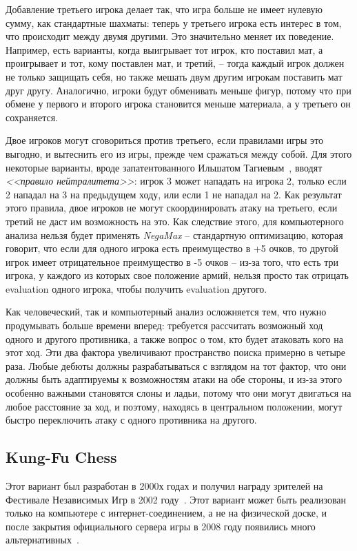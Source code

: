 \documentclass{article}
\begin{document}
Добавление третьего игрока делает так, что игра больше не имеет нулевую сумму,
как стандартные шахматы:
теперь у третьего игрока есть интерес в том, что происходит между двумя другими.
Это значительно меняет их поведение.
Например, есть варианты, когда выигрывает тот игрок, кто поставил мат,
а проигрывает и тот, кому поставлен мат, и третий, -- 
тогда каждый игрок должен не только защищать себя, но также мешать двум другим игрокам поставить мат друг другу.
Аналогично, игроки будут обменивать меньше фигур,
потому что при обмене у первого и второго игрока становится меньше материала,
а у третьего он сохраняется.

Двое игроков могут сговориться против третьего, если правилами игры это выгодно,
и вытеснить его из игры, прежде чем сражаться между собой.
Для этого некоторые варианты, вроде запатентованного Ильшатом Тагиевым~\cite{triad-chess},
вводят \emph{<<правило нейтралитета>>}:
игрок 3 может нападать на игрока 2, только если 2 нападал на 3 на предыдущем ходу,
или если 1 не нападал на 2. 
Как результат этого правила, двое игроков не могут скоординировать атаку на третьего,
если третий не даст им возможность на это. 
Как следствие этого, для компьютерного анализа нельзя будет применять \emph{NegaMax} --
стандартную оптимизацию, которая говорит, что если для одного игрока есть преимущество в +5 очков,
то другой игрок имеет отрицательное преимущество в -5 очков -- 
из-за того, что есть три игрока, у каждого из которых свое положение армий,
нельзя просто так отрицать evaluation одного игрока, 
чтобы получить evaluation другого.

Как человеческий, так и компьютерный анализ осложняется тем, что нужно продумывать больше времени вперед:
требуется рассчитать возможный ход одного и другого противника, а также
вопрос о том, кто будет атаковать кого на этот ход. 
Эти два фактора увеличивают пространство поиска примерно в четыре раза. 
Любые дебюты должны разрабатываться с взглядом на тот фактор,
что они должны быть адаптируемы к возможностям атаки на обе стороны,
и из-за этого особенно важными становятся слоны и ладьи,
потому что они могут двигаться на любое расстояние за ход,
и поэтому, находясь в центральном положении,
могут быстро переключить атаку с одного противника на другого.


\subsection{Kung-Fu Chess}

Этот вариант был разработан в 2000х годах
и получил награду зрителей на Фестивале Независимых Игр в 2002 году~\cite{igf-kungfuchess}.
Этот вариант может быть реализован только на компьютере с интернет-соединением,
а не на физической доске,
и после закрытия официального сервера игры в 2008 году
появились много альтернативных~\cite{kfchess}.
\end{document}
